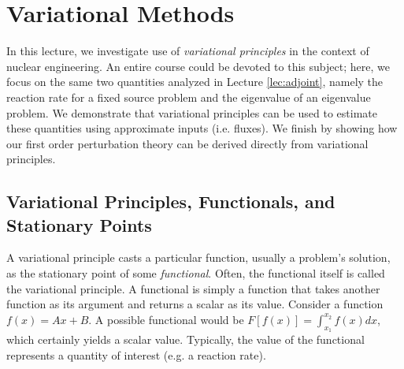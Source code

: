 \chapter{Variational Methods}

In this lecture, we investigate use of \textit{variational principles} in the context of nuclear engineering.  An entire course could be devoted to this subject; here, we focus on the same two quantities analyzed in Lecture \ref{lec:adjoint}, namely the reaction rate for a fixed source problem and the eigenvalue of an eigenvalue problem.  We demonstrate that variational principles can be used to estimate these quantities using approximate inputs (i.e. fluxes).  We finish by showing how our first order perturbation theory can be derived directly from variational principles.

\section*{Variational Principles, Functionals, and Stationary Points}

A variational principle casts a particular function, usually a problem's solution, as the stationary point of some \textit{functional}. Often, the functional itself is called the variational principle.  A functional is simply a function that takes another function as its argument and returns a scalar as its value.  Consider a function $f(x) = Ax + B$.  A possible functional would be $F[f(x)] = \int_{x_1}^{x_2} f(x)dx$, which certainly yields a scalar value.  Typically, the value of the functional represents a quantity of interest (e.g. a reaction rate).

